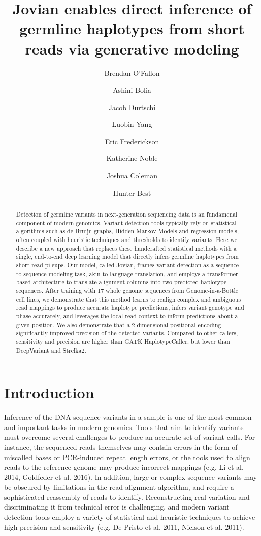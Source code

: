 \documentclass[]{article}
\title{Jovian enables direct inference of germline haplotypes from short reads via generative modeling}
\author[1]{Brendan O'Fallon}
\author[1]{Ashini Bolia}
\author[1]{Jacob Durtschi}
\author[1]{Luobin Yang}
\author[1]{Eric Frederickson}
\author[1]{Katherine Noble}
\author[1]{Joshua Coleman}
\author[1]{Hunter Best}
\affil[1]{ARUP Institute for Clinical and Experimental Pathology, Salt Lake City, UT}
\date{}
\begin{document}
\maketitle

\begin{abstract}
	Detection of germline variants in next-generation sequencing data is an fundamenal component of modern genomics. Variant detection tools typically rely on statistical algorithms such as de Bruijn graphs, Hidden Markov Models and regression models, often coupled with heuristic techniques and thresholds to identify variants. Here we describe a new approach that replaces these handcrafted statistical methods with a single, end-to-end deep learning model that directly infers germline haplotypes from short read pileups. Our model, called Jovian, frames variant detection as a sequence-to-sequence modeling task, akin to language translation, and employs a transformer-based architecture to translate alignment columns into two predicted haplotype sequences. After training with 17 whole genome sequences from Genome-in-a-Bottle cell lines, we demonstrate that this method learns to realign complex and ambiguous read mappings to produce accurate haplotype predictions, infers variant genotype and phase accurately, and leverages the local read context to inform predictions about a given position. We also demonstrate that a 2-dimensional positional encoding significantly improved precision of the detected variants. Compared to other callers, sensitivity and precision are higher than GATK HaplotypeCaller, but lower than DeepVariant and Strelka2. 
\end{abstract}


\section{Introduction}

Inference of the DNA sequence variants in a sample is one of the most common and important tasks in modern genomics. Tools that aim to identify variants must overcome several challenges to produce an accurate set of variant calls. For instance, the sequenced reads themselves may contain errors in the form of miscalled bases or PCR-induced repeat length errors, or the tools used to align reads to the reference genome may produce incorrect mappings (e.g. Li et al. 2014, Goldfeder et al. 2016).  In addition, large or complex sequence variants may be obscured by limitations in the read alignment algorithm, and require a sophisticated reassembly of reads to identify. Reconstructing real variation and discriminating it from technical error is challenging, and modern variant detection tools employ a variety of statistical and heuristic techniques to achieve high precision and sensitivity (e.g. De Pristo et al. 2011, Nielson et al. 2011). 
\end{document}
